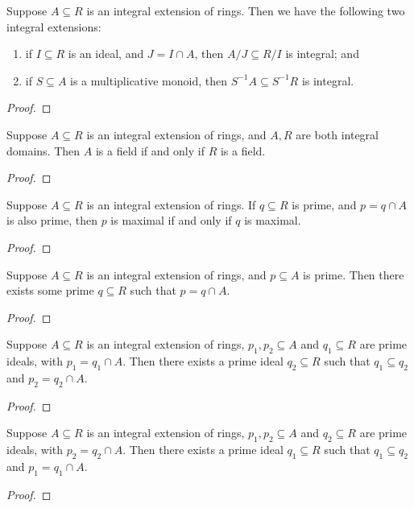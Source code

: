 \begin{lemma}
    Suppose \(A \subseteq R\) is an integral extension of rings.
    Then we have the following two integral extensions:
    \begin{enumerate}[label={(\alph*)}, itemsep=0mm]
        \item if \(I \subseteq R\) is an ideal, and \(J = I \cap A\),
        then \(A/J \subseteq R/I\) is integral; and
        \item if \(S \subseteq A\) is a multiplicative monoid,
        then \(S^{-1}A \subseteq S^{-1}R\) is integral.
    \end{enumerate}
\end{lemma}
\begin{proof}
    
\end{proof}
\begin{theorem}
    Suppose \(A \subseteq R\) is an integral extension of rings,
    and \(A,R\) are both integral domains.
    Then \(A\) is a field if and only if \(R\) is a field.
\end{theorem}
\begin{proof}
    
\end{proof}
\begin{corollary}
    Suppose \(A \subseteq R\) is an integral extension of rings.
    If \(q \subseteq R\) is prime, and \(p = q \cap A\) is also prime,
    then \(p\) is maximal if and only if \(q\) is maximal.
\end{corollary}
\begin{proof}
    
\end{proof}
\begin{theorem}
    Suppose \(A \subseteq R\) is an integral extension of rings,
    and \(p \subseteq A\) is prime.
    Then there exists some prime \(q \subseteq R\)
    such that \(p = q \cap A\).
\end{theorem}
\begin{proof}
    
\end{proof}

\begin{theorem}
    Suppose \(A \subseteq R\) is an integral extension of rings,
    \(p_1,p_2 \subseteq A\) and \(q_1 \subseteq R\) are prime ideals,
    with \(p_1 = q_1 \cap A\).
    Then there exists a prime ideal \(q_2 \subseteq R\)
    such that \(q_1 \subseteq q_2\) and \(p_2 = q_2 \cap A\).
\end{theorem}
\begin{proof}
    
\end{proof}
\begin{theorem}
    Suppose \(A \subseteq R\) is an integral extension of rings,
    \(p_1,p_2 \subseteq A\) and \(q_2 \subseteq R\) are prime ideals,
    with \(p_2 = q_2 \cap A\).
    Then there exists a prime ideal \(q_1 \subseteq R\)
    such that \(q_1 \subseteq q_2\) and \(p_1 = q_1 \cap A\).
\end{theorem}
\begin{proof}
    
\end{proof}


